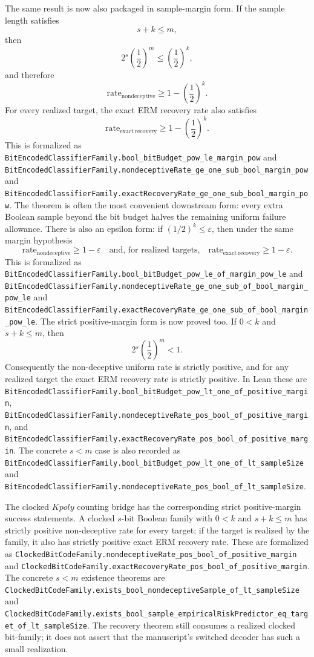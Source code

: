 \documentclass[11pt]{article}
\theoremstyle{remark}
\begin{document}
The same result is now also packaged in sample-margin form.  If the sample
length satisfies
\[
  s + k \le m,
\]
then
\[
  2^s\left(\frac12\right)^m \le \left(\frac12\right)^k,
\]
and therefore
\[
  \mathrm{rate}_{\mathrm{nondeceptive}}
  \ge 1 - \left(\frac12\right)^k.
\]
For every realized target, the exact ERM recovery rate also satisfies
\[
  \mathrm{rate}_{\mathrm{exact\ recovery}}
  \ge 1 - \left(\frac12\right)^k.
\]
This is formalized as
\texttt{BitEncodedClassifierFamily.bool\_bitBudget\_pow\_le\_margin\_pow} and
\texttt{BitEncodedClassifierFamily.nondeceptiveRate\_ge\_one\_sub\_bool\_margin\_pow}
and
\texttt{BitEncodedClassifierFamily.exactRecoveryRate\_ge\_one\_sub\_bool\_margin\_pow}.
The theorem is often the most convenient downstream form: every extra Boolean
sample beyond the bit budget halves the remaining uniform failure allowance.
There is also an epsilon form: if \((1/2)^k \le \varepsilon\), then under the
same margin hypothesis
\[
  \mathrm{rate}_{\mathrm{nondeceptive}} \ge 1 - \varepsilon
  \quad\text{and, for realized targets,}\quad
  \mathrm{rate}_{\mathrm{exact\ recovery}} \ge 1 - \varepsilon.
\]
This is formalized as
\texttt{BitEncodedClassifierFamily.bool\_bitBudget\_pow\_le\_of\_margin\_pow\_le}
and
\texttt{BitEncodedClassifierFamily.nondeceptiveRate\_ge\_one\_sub\_of\_bool\_margin\_pow\_le}
and
\texttt{BitEncodedClassifierFamily.exactRecoveryRate\_ge\_one\_sub\_of\_bool\_margin\_pow\_le}.
The strict positive-margin form is now proved too.  If \(0<k\) and
\(s+k\le m\), then
\[
  2^s\left(\frac12\right)^m < 1.
\]
Consequently the non-deceptive uniform rate is strictly positive, and for any
realized target the exact ERM recovery rate is strictly positive.  In Lean
these are
\texttt{BitEncodedClassifierFamily.bool\_bitBudget\_pow\_lt\_one\_of\_positive\_margin},
\texttt{BitEncodedClassifierFamily.nondeceptiveRate\_pos\_bool\_of\_positive\_margin},
and
\texttt{BitEncodedClassifierFamily.exactRecoveryRate\_pos\_bool\_of\_positive\_margin}.
The concrete \(s<m\) case is also recorded as
\texttt{BitEncodedClassifierFamily.bool\_bitBudget\_pow\_lt\_one\_of\_lt\_sampleSize}
and
\texttt{BitEncodedClassifierFamily.nondeceptiveRate\_pos\_bool\_of\_lt\_sampleSize}.

The clocked \(Kpoly\) counting bridge has the corresponding strict
positive-margin success statements.  A clocked \(s\)-bit Boolean family with
\(0<k\) and \(s+k\le m\) has strictly positive non-deceptive rate for every
target; if the target is realized by the family, it also has strictly positive
exact ERM recovery rate.  These are formalized as
\texttt{ClockedBitCodeFamily.nondeceptiveRate\_pos\_bool\_of\_positive\_margin}
and
\texttt{ClockedBitCodeFamily.exactRecoveryRate\_pos\_bool\_of\_positive\_margin}.
The concrete \(s<m\) existence theorems are
\texttt{ClockedBitCodeFamily.exists\_bool\_nondeceptiveSample\_of\_lt\_sampleSize}
and
\texttt{ClockedBitCodeFamily.exists\_bool\_sample\_empiricalRiskPredictor\_eq\_target\_of\_lt\_sampleSize}.
The recovery theorem still consumes a realized clocked bit-family; it does not
assert that the manuscript's switched decoder has such a small realization.
\end{document}
